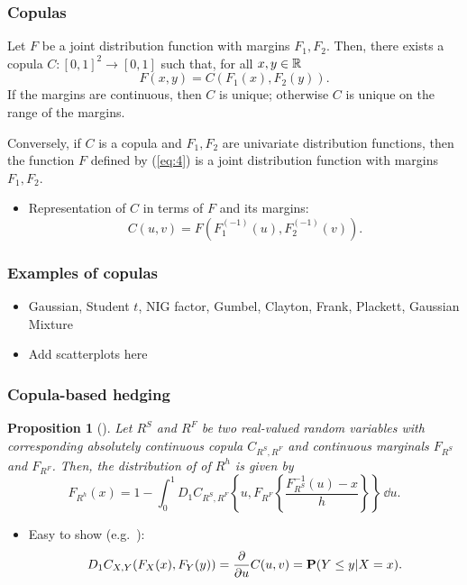 \documentclass[10pt,mathserif,notes=show]{beamer}
\renewcommand{\(}{\begin{columns}}
\renewcommand{\)}{\end{columns}}
\newcommand{\<}[1]{\begin{column}{#1}}
\renewcommand{\>}{\end{column}}
\newtheorem{proposition}[theorem]{Proposition}
\theoremstyle{definition}
\begin{document}
\begin{frame}
  \frametitle{Copulas}
  \begin{theorem}
  Let $F$ be a joint distribution function with margins $F_1,
  F_2$. Then, there exists a copula $C:[0,1]^2\rightarrow[0,1]$ such
  that, for all $x,y\in {\mathbb{R}}$
  \begin{equation}
    \label{eq:4}
    F(x,y)=C(F_1(x), F_2(y)). 
  \end{equation}
  If the margins are continuous, then $C$ is unique; otherwise $C$ is
  unique on the range of the margins.

  Conversely, if $C$ is a copula and $F_1, F_2$ are univariate
  distribution functions, then the function $F$ defined by (\ref{eq:4})
  is a joint distribution function with margins $F_1, F_2$.
\end{theorem}
\begin{itemize}
  \addtolength{\itemsep}{1pt}
\item Representation of $C$ in terms of $F$ and its
  margins: 
  \begin{equation*}
    C(u,v) = F(F_1^{(-1)}(u), F_2^{(-1)}(v)). 
  \end{equation*}
  \vspace*{-1.1\baselineskip}
\end{itemize}
\end{frame}

\begin{frame}
  \frametitle{Examples of copulas}
  \begin{itemize}
  \item Gaussian, Student $t$, NIG factor, Gumbel, Clayton, Frank,
    Plackett, Gaussian Mixture
  \item Add scatterplots here
  \end{itemize}
\end{frame}


\begin{frame}
  \frametitle{Copula-based hedging}
  \begin{proposition}[\cite{Barbi2014}]
  \label{prop:dfrh}
  Let $R^S$ and $R^F$ be two real-valued random variables with
  corresponding 
  absolutely continuous copula $C_{R^S, R^F}$ and
  continuous marginals $F_{R^S}$ and $F_{R^F}$. Then, the distribution
  of of $R^h$ is given by
  \begin{equation}
    \label{eq:3}
    F_{R^h}(x) = 1- \int^1_0 D_1 C_{R^S, R^F}
    \left\{ u, F_{R^F} \left\{ \frac{F^{-1}_{R^S}(u)-x}{h} \right\}
    \right\}\, \dd u.
  \end{equation}
\end{proposition}
\begin{itemize}
\item Easy to show (e.g.\ \citet{McNeil2005}):
\begin{equation*}
  D_1 C_{X,Y}(F_X(x), F_Y(y)) = \frac{\partial}{\partial u} C(u,v) = {\bf P}(Y\leq y|X=x).
\end{equation*}
\end{itemize}
\end{frame}
\end{document}
